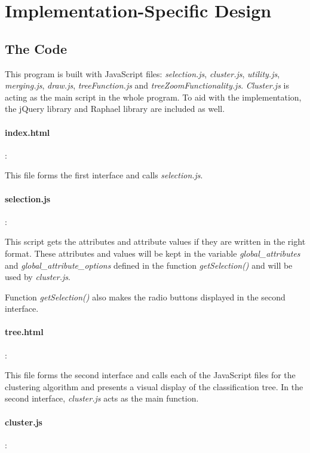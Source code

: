 %
%
%

\section{Implementation-Specific Design}

\subsection{The Code}
This program is built with JavaScript files: \emph{selection.js}, \emph{cluster.js}, \emph{utility.js}, \emph{merging.js}, \emph{draw.js}, \emph{treeFunction.js} and \emph{treeZoomFunctionality.js}. \emph{Cluster.js} is acting as the main script in the whole program. To aid with the implementation, the jQuery library and Raphael library are included as well.

\paragraph{index.html}:

This file forms the first interface and calls \emph{selection.js}.

\paragraph{selection.js}:

This script gets the attributes and attribute values if they are written in the right format. These attributes and values will be kept in the variable  \emph{global\_attributes} and \emph{global\_attribute\_options} defined in the function \emph{getSelection()} and will be used by \emph{cluster.js}.

Function \emph{getSelection()} also makes the radio buttons displayed in the second interface.

\paragraph{tree.html}:

This file forms the second interface and calls each of the JavaScript files for the clustering algorithm and presents a visual display of the classification tree. In the second interface, \emph{cluster.js} acts as the main function.


\paragraph{cluster.js}:

